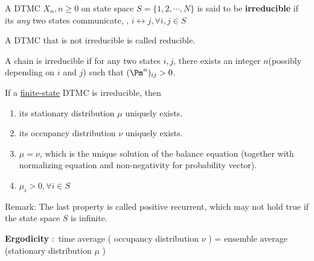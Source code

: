 \documentclass[english,10pt]{beamer}
\begin{document}
\begin{frame}

\begin{definition}%
A DTMC ${X_{n},n\geq0}$ on state space $S=\{1,2,\cdots,N\}$ is said
to be \textbf{irreducible} if  its {\it any} two states communicate, \ie, $i\leftrightarrow j, \forall i,j 
\in S$%

A DTMC that is not irreducible is called reducible.
\end{definition}%


A chain  is   irreducible if for any two states $i,j$, there exists an integer $n$(possibly depending on $i$ and $j$) such that $(\Pm^{n})_{ij}  > 0$. 

\pause
 
\begin{theorem}
If a \underline{finite-state}  DTMC is irreducible, then

\begin{enumerate}
\item its stationary distribution $\mu$  uniquely exists.
\item its occupancy distribution $\nu$ uniquely exists.
\item $\mu=\nu$, which is  the unique solution of the balance equation (together with normalizing equation and non-negativity  for probability vector).
\item $\mu_i>0,\forall i \in S$ \end{enumerate}
\end{theorem}%
\pause
Remark: The last property is called  positive recurrent, which may  not hold true if the state space $S$ is  infinite.  

\pause
{{\bf Ergodicity} $:$ time average ( occupancy distribution $\nu$ ) = ensemble average (stationary distribution $\mu$ )}


\end{frame}
\end{document}
